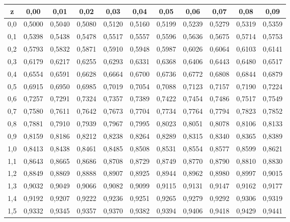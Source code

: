 \begin{table}[h!]
    \centering
    \begin{scriptsize}
     \begin{tabular}{c|cccccccccc}
        \hline
        z & 0,00 & 0,01 & 0,02 & 0,03 & 0,04 & 0,05 & 0,06 & 0,07 & 0,08 & 0,09 \\
        \hline
                0,0 & 0,5000 & 0,5040 & 0,5080 & 0,5120 & 0,5160 & 0,5199 & 0,5239 & 0,5279 & 0,5319 & 0,5359 \\
        0,1 & 0,5398 & 0,5438 & 0,5478 & 0,5517 & 0,5557 & 0,5596 & 0,5636 & 0,5675 & 0,5714 & 0,5753 \\
        0,2 & 0,5793 & 0,5832 & 0,5871 & 0,5910 & 0,5948 & 0,5987 & 0,6026 & 0,6064 & 0,6103 & 0,6141 \\
        0,3 & 0,6179 & 0,6217 & 0,6255 & 0,6293 & 0,6331 & 0,6368 & 0,6406 & 0,6443 & 0,6480 & 0,6517 \\
        0,4 & 0,6554 & 0,6591 & 0,6628 & 0,6664 & 0,6700 & 0,6736 & 0,6772 & 0,6808 & 0,6844 & 0,6879 \\
        0,5 & 0,6915 & 0,6950 & 0,6985 & 0,7019 & 0,7054 & 0,7088 & 0,7123 & 0,7157 & 0,7190 & 0,7224 \\
        0,6 & 0,7257 & 0,7291 & 0,7324 & 0,7357 & 0,7389 & 0,7422 & 0,7454 & 0,7486 & 0,7517 & 0,7549 \\
        0,7 & 0,7580 & 0,7611 & 0,7642 & 0,7673 & 0,7704 & 0,7734 & 0,7764 & 0,7794 & 0,7823 & 0,7852 \\
        0,8 & 0,7881 & 0,7910 & 0,7939 & 0,7967 & 0,7995 & 0,8023 & 0,8051 & 0,8078 & 0,8106 & 0,8133 \\
        0,9 & 0,8159 & 0,8186 & 0,8212 & 0,8238 & 0,8264 & 0,8289 & 0,8315 & 0,8340 & 0,8365 & 0,8389 \\
        1,0 & 0,8413 & 0,8438 & 0,8461 & 0,8485 & 0,8508 & 0,8531 & 0,8554 & 0,8577 & 0,8599 & 0,8621 \\
        1,1 & 0,8643 & 0,8665 & 0,8686 & 0,8708 & 0,8729 & 0,8749 & 0,8770 & 0,8790 & 0,8810 & 0,8830 \\
        1,2 & 0,8849 & 0,8869 & 0,8888 & 0,8907 & 0,8925 & 0,8944 & 0,8962 & 0,8980 & 0,8997 & 0,9015 \\
        1,3 & 0,9032 & 0,9049 & 0,9066 & 0,9082 & 0,9099 & 0,9115 & 0,9131 & 0,9147 & 0,9162 & 0,9177 \\
        1,4 & 0,9192 & 0,9207 & 0,9222 & 0,9236 & 0,9251 & 0,9265 & 0,9279 & 0,9292 & 0,9306 & 0,9319 \\
        1,5 & 0,9332 & 0,9345 & 0,9357 & 0,9370 & 0,9382 & 0,9394 & 0,9406 & 0,9418 & 0,9429 & 0,9441 \\

\end{tabular}
\end{scriptsize}
\end{table}
